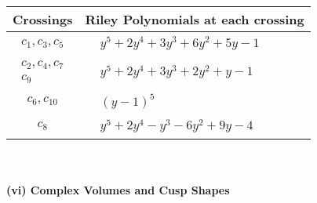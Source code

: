\documentclass[1p]{elsarticle_modified}
\theoremstyle{definition}
\begin{document}
\begin{tabular}{m{50pt}|m{274pt}}
Crossings & \hspace{64pt}Riley Polynomials at each crossing \\
\hline $$\begin{aligned}c_{1},c_{3},c_{5}\end{aligned}$$&$\begin{aligned}
&y^5+2 y^4+3 y^3+6 y^2+5 y-1
\end{aligned}$\\
\hline $$\begin{aligned}c_{2},c_{4},c_{7}\\c_{9}\end{aligned}$$&$\begin{aligned}
&y^5+2 y^4+3 y^3+2 y^2+y-1
\end{aligned}$\\
\hline $$\begin{aligned}c_{6},c_{10}\end{aligned}$$&$\begin{aligned}
&(y-1)^5
\end{aligned}$\\
\hline $$\begin{aligned}c_{8}\end{aligned}$$&$\begin{aligned}
&y^5+2 y^4- y^3-6 y^2+9 y-4
\end{aligned}$\\
\hline
\end{tabular}\\~\\
\newpage\flushleft \textbf{(vi) Complex Volumes and Cusp Shapes}
\end{document}
